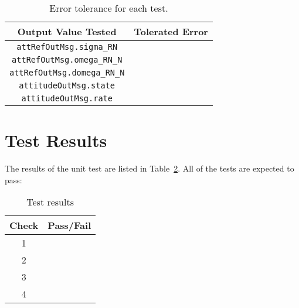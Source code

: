 \begin{table}[htbp]
	\caption{Error tolerance for each test.}
	\label{tab:errortol}
	\centering \fontsize{10}{10}\selectfont
	\begin{tabular}{ c | c } %
		\hline\hline
		\textbf{Output Value Tested}  & \textbf{Tolerated Error}  \\ 
		\hline
		{\tt attRefOutMsg.sigma\_RN}        & 	   \\
		{\tt attRefOutMsg.omega\_RN\_N}        & 	   \\
		{\tt attRefOutMsg.domega\_RN\_N}        & 	   \\
		{\tt attitudeOutMsg.state}        & 	   \\
		{\tt attitudeOutMsg.rate}        & 	   \\
		\hline\hline
	\end{tabular}
\end{table}




\section{Test Results}
The results of the unit test are listed in Table~\ref{tab:results}.  
All of the tests are expected to pass:
\begin{table}[H]
	\caption{Test results}
	\label{tab:results}
	\centering \fontsize{10}{10}\selectfont
	\begin{tabular}{c | c  } %
		\hline\hline
		\textbf{Check} 						  		&\textbf{Pass/Fail} \\ 
		\hline
	   1	   			&  \\ 
	   2	   			&  \\ 
	   3	   			&  \\ 
	   4	   			&  \\ 
	   \hline\hline
	\end{tabular}
\end{table}


